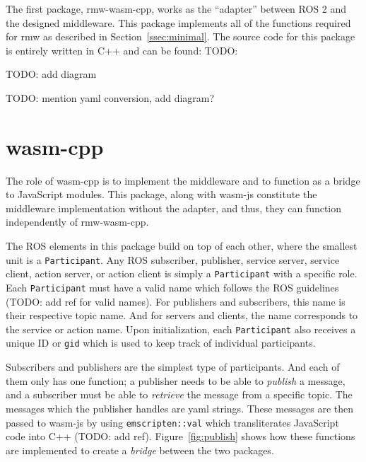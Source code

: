         The first package, \textsf{rmw-wasm-cpp}, works as the ``adapter'' between \ac{ROS} 2 and the designed middleware. This package implements all of the functions required for \textsf{rmw} as described in Section~\ref{ssec:minimal}. The source code for this package is entirely written in C++ and can be found: TODO: 

        TODO: add diagram

        TODO: mention yaml conversion, add diagram?

    \section{wasm-cpp}

        The role of \textsf{wasm-cpp} is to implement the middleware and to function as a bridge to JavaScript modules. This package, along with \textsf{wasm-js} constitute the middleware implementation without the adapter, and thus, they can function independently of \textsf{rmw-wasm-cpp}. 

        The \ac{ROS} elements in this package build on top of each other, where the smallest unit is a \texttt{Participant}. Any \ac{ROS} subscriber, publisher, service server, service client, action server, or action client is simply a \texttt{Participant} with a specific role. Each \texttt{Participant} must have a valid name which follows the \ac{ROS} guidelines (TODO: add ref for valid names). For publishers and subscribers, this name is their respective topic name. And for servers and clients, the name corresponds to the service or action name.  Upon initialization, each \texttt{Participant} also receives a unique ID or \texttt{gid} which is used to keep track of individual participants. 

        Subscribers and publishers are the simplest type of participants. And each of them only has one function; a publisher needs to be able to \textit{publish} a message, and a subscriber must be able to \textit{retrieve} the message from a specific topic. The messages which the publisher handles are yaml strings. These messages are then passed to \textsf{wasm-js} by using \texttt{emscripten::val} which transliterates JavaScript code into C++ (TODO: add ref). Figure~\ref{fig:publish} shows how these functions are implemented to create a \textit{bridge} between the two packages.

